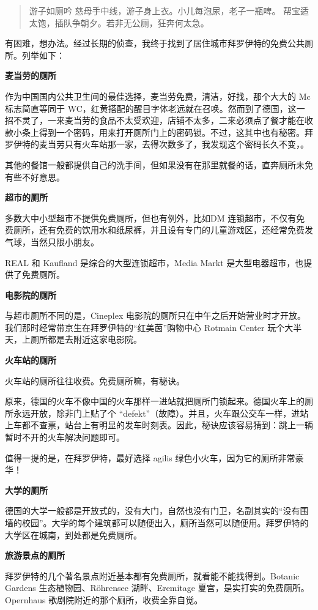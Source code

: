 \documentclass[twoside,openright,headings=optiontohead]{ctexbook} %
\begin{document}
{\begin{quote}
游子如厕吟 慈母手中线，游子身上衣。小儿每泡尿，老子一瓶啤。
帮宝适太饱，插队争朝夕。若非无公厕，狂奔何太急。
\end{quote}

有困难，想办法。经过长期的侦查，我终于找到了居住城市拜罗伊特的免费公共厕所。列举如下：

\textbf{麦当劳的厕所}

作为中国国内公共卫生间的最佳选择，麦当劳免费，清洁，好找，那个大大的 Mc
标志简直等同于
WC，红黄搭配的醒目字体老远就在召唤。然而到了德国，这一招不灵了，一来麦当劳的食品不太受欢迎，店铺不太多，二来必须点了餐才能在收款小条上得到一个密码，用来打开厕所门上的密码锁。不过，这其中也有秘密。拜罗伊特的麦当劳只有火车站那一家，去得次数多了，我发现这个密码长久不变，。

其他的餐馆一般都提供自己的洗手间，但如果没有在那里就餐的话，直奔厕所未免有些不好意思。

\textbf{超市的厕所}

多数大中小型超市不提供免费厕所，但也有例外，比如DM
连锁超市，不仅有免费厕所，还有免费的饮用水和纸尿裤，并且设有专门的儿童游戏区，还经常免费发气球，当然只限小朋友。

REAL 和 Kaufland 是综合的大型连锁超市，Media Markt
是大型电器超市，也提供了免费厕所。

\textbf{电影院的厕所}

与超市厕所不同的是，Cineplex
电影院的厕所只在中午之后开始营业时才开放。我们那时经常带京生在拜罗伊特的``红美茵''购物中心
Rotmain Center 玩个大半天，上厕所都是去附近这家电影院。

\textbf{火车站的厕所}

火车站的厕所往往收费。免费厕所嘛，有秘诀。

原来，德国的火车不像中国的火车那样一进站就把厕所门锁起来。德国火车上的厕所永远开放，除非门上贴了个
``defekt''（故障）。并且，火车跟公交车一样，进站上车都不查票，站台上有明显的发车时刻表。因此，秘诀应该容易猜到：跳上一辆暂时不开的火车解决问题即可。

值得一提的是，在拜罗伊特，最好选择 agilis
绿色小火车，因为它的厕所非常豪华！

\textbf{大学的厕所}

德国的大学一般都是开放式的，没有大门，自然也没有门卫，名副其实的``没有围墙的校园''。大学的每个建筑都可以随便出入，厕所当然可以随便用。拜罗伊特的大学区在城南，到处都是免费厕所。

\textbf{旅游景点的厕所}

拜罗伊特的几个著名景点附近基本都有免费厕所，就看能不能找得到。Botanic
Gardens 生态植物园、Röhrensee 湖畔、Eremitage
夏宫，是实打实的免费厕所。Opernhaus 歌剧院附近的那个厕所，收费全靠自觉。

}
\end{document}
